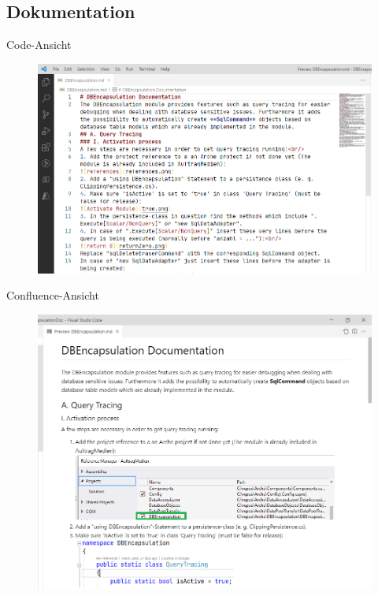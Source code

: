 \documentclass[toc]{beamer}
\begin{document}
    \subsection{Dokumentation}
        \begin{frame}{Code-Ansicht}
            \begin{figure}[htp]
                    \includegraphics[scale=0.3]{doku1.PNG}
                \end{figure}
        \end{frame}
        
        \begin{frame}{Confluence-Ansicht}
            \begin{figure}[htp]
                    \includegraphics[scale=0.3]{doku2.PNG}
                \end{figure}
        \end{frame}
\end{document}
